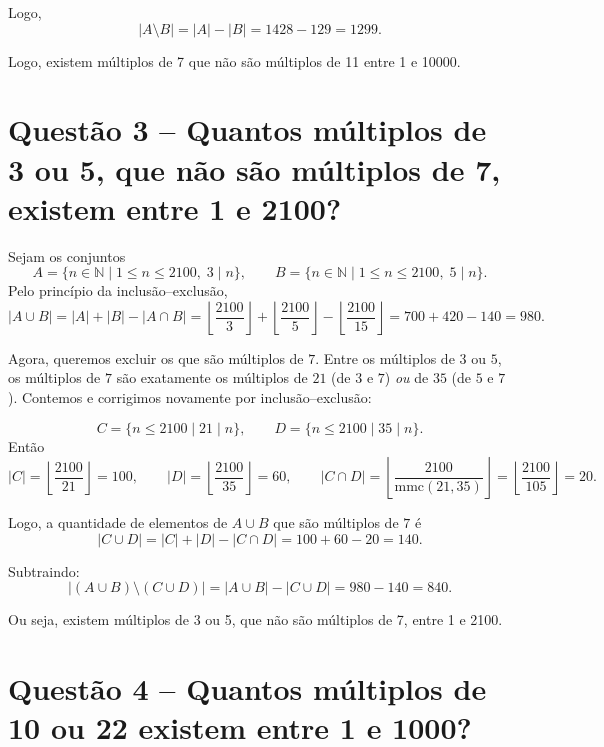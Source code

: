 \documentclass[12pt,a4paper]{article}
\begin{document}
    Logo,
    \[
    |A\setminus B|=|A|-|B|
    =1428-129=\boxed{1299}.
    \]

    \vspace{0.5cm}

    Logo, existem  múltiplos de 7 que não são múltiplos de 11 entre 1 e 10000.

\section*{Questão 3 -- Quantos múltiplos de 3 ou 5, que não são múltiplos de 7, existem entre 1 e 2100?}
    
    Sejam os conjuntos
    \[
    A=\{n\in\mathbb{N}\mid 1\le n\le 2100,\; 3\mid n\},\qquad
    B=\{n\in\mathbb{N}\mid 1\le n\le 2100,\; 5\mid n\}.
    \]
    Pelo princípio da inclusão–exclusão,
    \[
    |A\cup B| = |A|+|B|-|A\cap B|
    = \left\lfloor\frac{2100}{3}\right\rfloor
    + \left\lfloor\frac{2100}{5}\right\rfloor
    - \left\lfloor\frac{2100}{15}\right\rfloor
    = 700+420-140 = 980.
    \]
    
    Agora, queremos excluir os que são múltiplos de $7$. Entre os múltiplos de $3$ ou $5$, os múltiplos de $7$ são exatamente os múltiplos de $21$ (de $3$ e $7$) \emph{ou} de $35$ (de $5$ e $7$). Contemos e corrigimos novamente por inclusão–exclusão:
    
    \[
    C=\{n\le 2100\mid 21\mid n\},\qquad
    D=\{n\le 2100\mid 35\mid n\}.
    \]
    Então
    \[
    |C|=\left\lfloor\frac{2100}{21}\right\rfloor=100,\qquad
    |D|=\left\lfloor\frac{2100}{35}\right\rfloor=60,\qquad
    |C\cap D|=\left\lfloor\frac{2100}{\mathrm{mmc}(21,35)}\right\rfloor
    =\left\lfloor\frac{2100}{105}\right\rfloor=20.
    \]

    \vspace{0.5cm}

    Logo, a quantidade de elementos de $A\cup B$ que são múltiplos de $7$ é
    \[
    |C\cup D|=|C|+|D|-|C\cap D|=100+60-20=140.
    \]
    
    Subtraindo:
    \[
    |(A\cup B)\setminus (C\cup D)|=|A\cup B|-|C\cup D|
    =980-140=\boxed{840}.
    \]
    
    Ou seja, existem  múltiplos de 3 ou 5, que não são múltiplos de 7, entre 1 e 2100.

\section*{Questão 4 -- Quantos múltiplos de 10 ou 22 existem entre 1 e 1000?}
\end{document}
